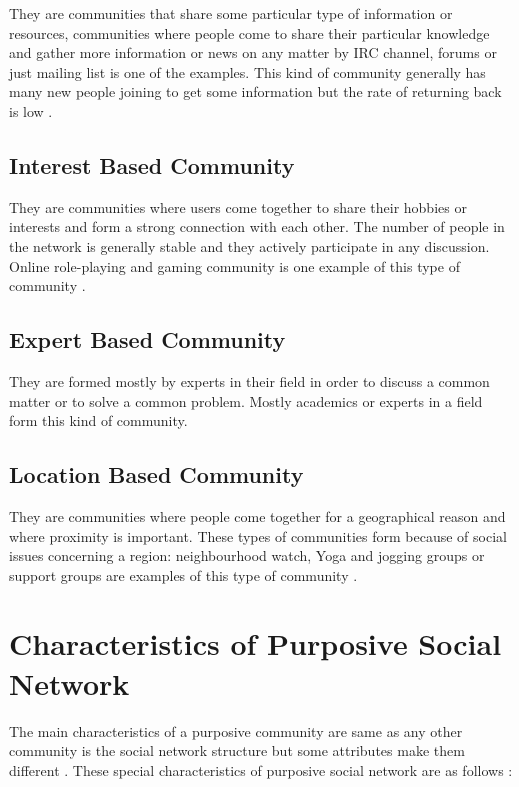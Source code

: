 They are communities that share some particular type of information or resources, communities where people come to share their particular knowledge and gather more information or news on any matter by IRC channel, forums or just mailing list is one of the examples. This kind of community generally has many new people joining to get some information but the rate of returning back is low \cite{tantipathananandh2007}.


\subsection{Interest Based Community}


They are communities where users come together to share their hobbies or interests and form a strong connection with each other. The number of people in the network is generally stable and they actively participate in any discussion. Online role-playing and gaming community is one example of this type of community \cite{newman2004detecting}.


\subsection{Expert Based Community}


They are formed mostly by experts in their field in order to discuss a common matter or to solve a common problem. Mostly academics or experts in a field form this kind of community.


\subsection{Location Based Community}

They are communities where people come together for a geographical reason and where proximity is important. These types of communities form because of social issues concerning a region: neighbourhood watch, Yoga and jogging groups or support groups are examples of this type of community \cite{smith2008social}.


\section{Characteristics of Purposive Social Network}

The main characteristics of a purposive community are same as any other community is the social network structure but some attributes make them different . These special characteristics of purposive social network are as follows \cite{katz2004network}:


